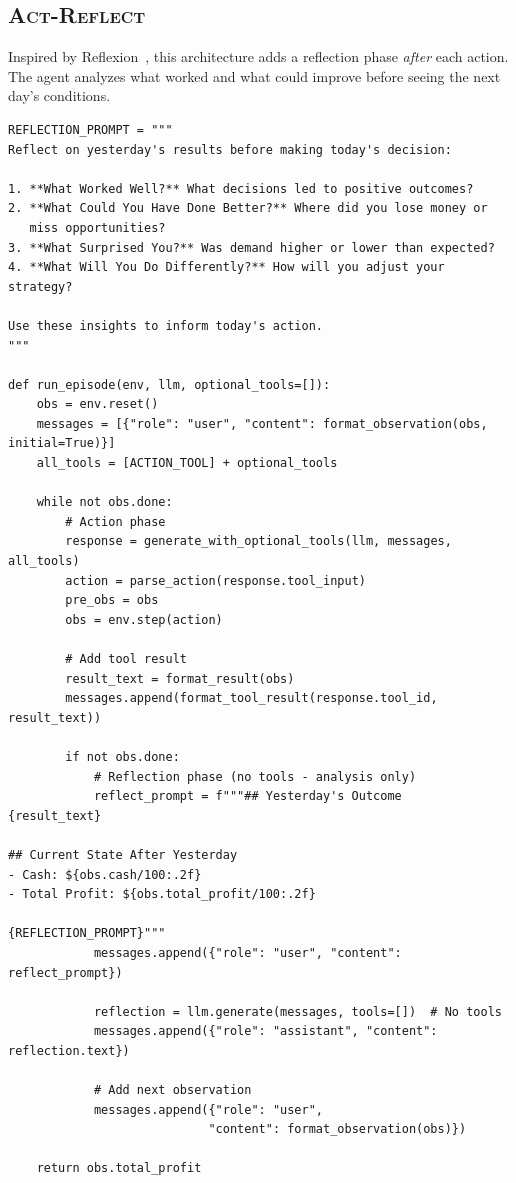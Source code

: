 \subsection{\textsc{Act-Reflect}}

Inspired by Reflexion~\citep{shinn2023reflexion}, this architecture adds a reflection phase \emph{after} each action. The agent analyzes what worked and what could improve before seeing the next day's conditions.

\begin{verbatim}
REFLECTION_PROMPT = """
Reflect on yesterday's results before making today's decision:

1. **What Worked Well?** What decisions led to positive outcomes?
2. **What Could You Have Done Better?** Where did you lose money or 
   miss opportunities?
3. **What Surprised You?** Was demand higher or lower than expected?
4. **What Will You Do Differently?** How will you adjust your strategy?

Use these insights to inform today's action.
"""

def run_episode(env, llm, optional_tools=[]):
    obs = env.reset()
    messages = [{"role": "user", "content": format_observation(obs, initial=True)}]
    all_tools = [ACTION_TOOL] + optional_tools
    
    while not obs.done:
        # Action phase
        response = generate_with_optional_tools(llm, messages, all_tools)
        action = parse_action(response.tool_input)
        pre_obs = obs
        obs = env.step(action)
        
        # Add tool result
        result_text = format_result(obs)
        messages.append(format_tool_result(response.tool_id, result_text))
        
        if not obs.done:
            # Reflection phase (no tools - analysis only)
            reflect_prompt = f"""## Yesterday's Outcome
{result_text}

## Current State After Yesterday
- Cash: ${obs.cash/100:.2f}
- Total Profit: ${obs.total_profit/100:.2f}

{REFLECTION_PROMPT}"""
            messages.append({"role": "user", "content": reflect_prompt})
            
            reflection = llm.generate(messages, tools=[])  # No tools
            messages.append({"role": "assistant", "content": reflection.text})
            
            # Add next observation
            messages.append({"role": "user", 
                            "content": format_observation(obs)})
    
    return obs.total_profit
\end{verbatim}

